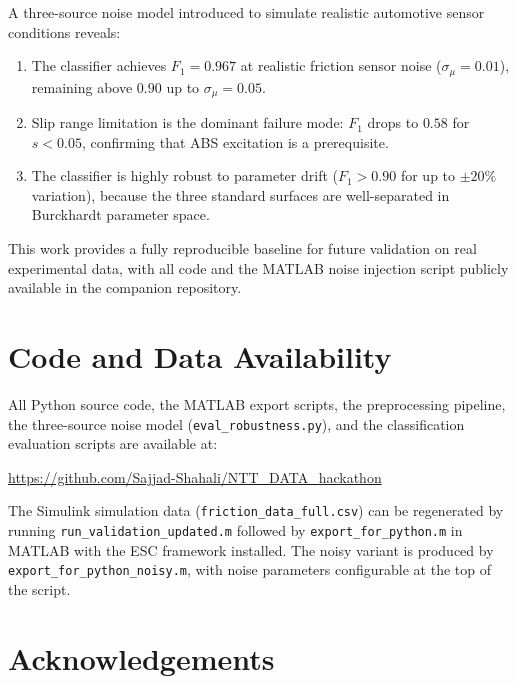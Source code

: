 \documentclass[11pt,a4paper]{article}
\begin{document}
A three-source noise model introduced to simulate realistic automotive sensor
conditions reveals:
\begin{enumerate}
  \item The classifier achieves $F_1 = 0.967$ at realistic friction sensor
        noise ($\sigma_\mu = 0.01$), remaining above $0.90$ up to $\sigma_\mu = 0.05$.
  \item Slip range limitation is the dominant failure mode: $F_1$ drops to
        $0.58$ for $s < 0.05$, confirming that ABS excitation is a prerequisite.
  \item The classifier is highly robust to parameter drift ($F_1 > 0.90$
        for up to $\pm 20\%$ variation), because the three standard surfaces are
        well-separated in Burckhardt parameter space.
\end{enumerate}

This work provides a fully reproducible baseline for future validation on
real experimental data, with all code and the MATLAB noise injection script
publicly available in the companion repository.

\section*{Code and Data Availability}

All Python source code, the MATLAB export scripts, the preprocessing pipeline,
the three-source noise model (\texttt{eval\_robustness.py}), and the
classification evaluation scripts are available at:
\begin{center}
  \url{https://github.com/Sajjad-Shahali/NTT_DATA_hackathon}
\end{center}
The Simulink simulation data (\texttt{friction\_data\_full.csv}) can be
regenerated by running \texttt{run\_validation\_updated.m} followed by
\texttt{export\_for\_python.m} in MATLAB with the ESC framework installed.
The noisy variant is produced by \texttt{export\_for\_python\_noisy.m},
with noise parameters configurable at the top of the script.

\section*{Acknowledgements}
\end{document}
